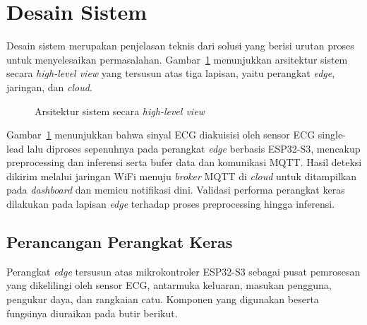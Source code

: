 \section{Desain Sistem}

Desain sistem merupakan penjelasan teknis dari solusi yang berisi urutan proses untuk menyelesaikan permasalahan. Gambar~\ref{fig:arsitektur-sistem} menunjukkan arsitektur sistem secara \textit{high-level view} yang tersusun atas tiga lapisan, yaitu perangkat \textit{edge}, jaringan, dan \textit{cloud}.

\begin{figure}[H]
  \centering
  \caption{Arsitektur sistem secara \textit{high-level view}}
  \label{fig:arsitektur-sistem}
\end{figure}

Gambar~\ref{fig:arsitektur-sistem} menunjukkan bahwa sinyal ECG diakuisisi oleh sensor ECG single-lead lalu diproses sepenuhnya pada perangkat \textit{edge} berbasis ESP32-S3, mencakup preprocessing dan inferensi serta bufer data dan komunikasi MQTT. Hasil deteksi dikirim melalui jaringan WiFi menuju \textit{broker} MQTT di \textit{cloud} untuk ditampilkan pada \textit{dashboard} dan memicu notifikasi dini. Validasi performa perangkat keras dilakukan pada lapisan \textit{edge} terhadap proses preprocessing hingga inferensi.

\subsection{Perancangan Perangkat Keras}

Perangkat \textit{edge} tersusun atas mikrokontroler ESP32-S3 sebagai pusat pemrosesan yang dikelilingi oleh sensor ECG, antarmuka keluaran, masukan pengguna, pengukur daya, dan rangkaian catu. Komponen yang digunakan beserta fungsinya diuraikan pada butir berikut.

